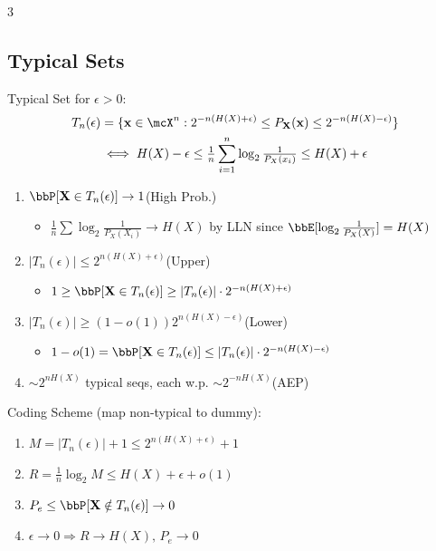 \documentclass[12pt, a4paper]{article}
\begin{document}
\begin{multicols*}{3}
\subsection{Typical Sets}
Typical Set for $\epsilon>0$:
\begin{gather*}
  T_n(\epsilon)=\{\bx\in\mcX^n:2^{-n(H(X)+\epsilon)}\le P_{\bX}(\bx)\le 2^{-n(H(X)-\epsilon)}\}\\
  \iff H(X)-\epsilon\le\tfrac{1}{n}\sum_{i=1}^n\log_2\tfrac{1}{P_X(x_i)}\le H(X)+\epsilon
\end{gather*}
\begin{enumerate}[\roman*.]
  \item $\Pr[\bX\in T_n(\epsilon)]\to 1$\hfill(High Prob.)
    \begin{itemize}[leftmargin=*]\vspace{3pt}
      \item $\tfrac{1}{n}\sum\log_2\tfrac{1}{P_X(X_i)}\to H(X)$ by LLN since $\E[\log_2\tfrac{1}{P_X(X)}]=H(X)$
    \end{itemize}
  \item $|T_n(\epsilon)|\le 2^{n(H(X)+\epsilon)}$\hfill(Upper)
    \begin{itemize}[leftmargin=*]\vspace{3pt}
      \item $1\ge\Pr[\bX\in T_n(\epsilon)]\ge|T_n(\epsilon)|\cdot 2^{-n(H(X)+\epsilon)}$
    \end{itemize}
  \item $|T_n(\epsilon)|\ge(1-o(1))2^{n(H(X)-\epsilon)}$\hfill(Lower)
    \begin{itemize}[leftmargin=*]\vspace{3pt}
      \item $1-o(1)=\Pr[\bX\in T_n(\epsilon)]\le|T_n(\epsilon)|\cdot 2^{-n(H(X)-\epsilon)}$
    \end{itemize}
  \item $\sim 2^{nH(X)}$ typical seqs, each w.p. $\sim 2^{-nH(X)}$\hfill(AEP)
\end{enumerate}
 
Coding Scheme (map non-typical to dummy):
\begin{enumerate}[\roman*.]
  \item $M=|T_n(\epsilon)|+1\le 2^{n(H(X)+\epsilon)}+1$
  \item $R=\tfrac{1}{n}\log_2 M\le H(X)+\epsilon+o(1)$
  \item $P_e\le\Pr[\bX\notin T_n(\epsilon)]\to 0$
  \item $\epsilon\to 0\Rightarrow R\to H(X),\,P_e\to 0$
\end{enumerate}


\end{multicols*}
\end{document}
